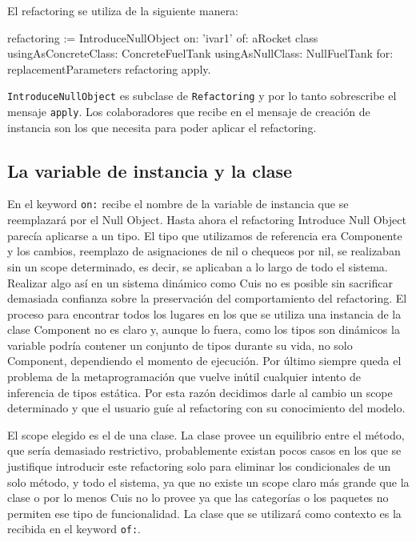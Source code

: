 El refactoring se utiliza de la siguiente manera:

\begin{code}
refactoring := IntroduceNullObject
    on: 'ivar1'
    of: aRocket class
    usingAsConcreteClass: ConcreteFuelTank
    usingAsNullClass: NullFuelTank
    for: replacementParameters
refactoring apply.
\end{code}

\lstinline{IntroduceNullObject} es subclase de \lstinline{Refactoring} y por lo tanto sobrescribe el
mensaje \lstinline{apply}. Los colaboradores que recibe en el mensaje de creación de instancia son 
los que necesita para poder aplicar el refactoring.

\subsection*{La variable de instancia y la clase}
En el keyword \lstinline{on:} recibe el nombre de la variable de instancia que se reemplazará por el
Null Object. Hasta ahora el refactoring Introduce Null Object parecía aplicarse a un tipo. El tipo
que utilizamos de referencia era Componente y los cambios, reemplazo de asignaciones de nil o 
chequeos por nil, se realizaban sin un scope determinado, es decir, se aplicaban a lo largo de todo
el sistema. Realizar algo así en un sistema dinámico como Cuis no es posible sin sacrificar
demasiada confianza sobre la preservación del comportamiento del refactoring. El proceso para encontrar
todos los lugares en los que se utiliza una instancia de la clase Component no es claro y, aunque lo
fuera, como los tipos son dinámicos la variable podría contener un conjunto de tipos durante su
vida, no solo Component, dependiendo el momento de ejecución. Por último siempre queda el problema de
la metaprogramación que vuelve inútil cualquier intento de inferencia de tipos estática. Por esta
razón decidimos darle al cambio un scope determinado y que el usuario guíe al refactoring con su
conocimiento del modelo.

El scope elegido es el de una clase. La clase provee un equilibrio entre el método, que sería
demasiado restrictivo, probablemente existan pocos casos en los que se justifique introducir este
refactoring solo para eliminar los condicionales de un solo método, y todo el sistema, ya que no
existe un scope claro más grande que la clase o por lo menos Cuis no lo provee ya que las categorías
o los paquetes no permiten ese tipo de funcionalidad. La clase que se utilizará como contexto es la 
recibida en el keyword \lstinline{of:}.

